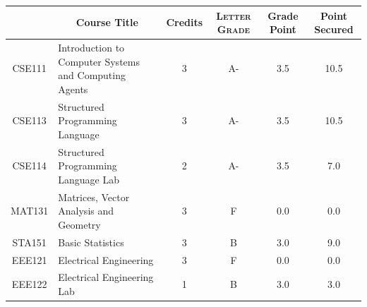 \documentclass[11pt]{article}
\newcommand*{\numtwo}[1]{\pgfmathprintnumber[
                    fixed, precision=2, fixed zerofill=true]{#1}}
\begin{document}
                \begin{center}
                    \renewcommand{\arraystretch}{1.08}
                    
                \begin{tabular}{|c|l|c|>{\scshape}c|c|c|}
                \hline  \rule[-1ex]{0pt}{3.5ex} {\centering{\bf Course Code}} &  \multicolumn{1}{c|}{\textbf{Course Title}}  & {\bf Credits} & {\bf Letter Grade} & {\bf Grade Point} & {\bf Point Secured}  \\ 
                \hline   CSE111 &  Introduction to Computer Systems and Computing Agents		 & 3 & A- & 3.5 & 10.5 \\ %
                \hline   CSE113 &  Structured Programming Language		 & 3 & A- & 3.5 & 10.5 \\ %
                \hline   CSE114 &  Structured Programming Language Lab		 & 2 & A- & 3.5 & 7.0 \\ %
                \hline   MAT131 &  Matrices, Vector Analysis and Geometry		 & 3 & F & 0.0 & 0.0 \\ %
                \hline   STA151 &  Basic Statistics		 & 3 & B & 3.0 & 9.0 \\ %
                \hline   EEE121 &  Electrical Engineering		 & 3 & F & 0.0 & 0.0 \\ %
                \hline   EEE122 &  Electrical Engineering Lab		 & 1 & B & 3.0 & 3.0 \\ %

\hline                %
                \end{tabular}
                \end{center}
                \renewcommand{\arraystretch}{1.03}
\end{document}
